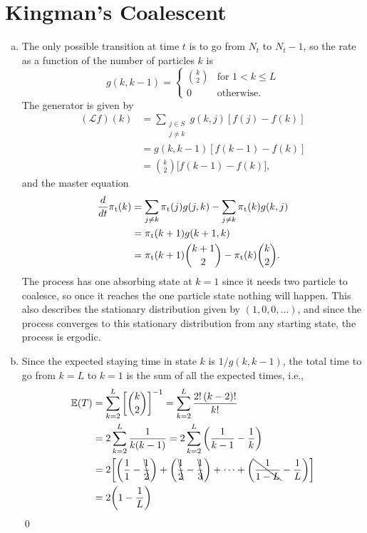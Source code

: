 \documentclass[12pt, twoside, a4paper]{article}
\newcommand{\Gen}{\mathcal{L}}
\begin{document}
\section{Kingman's Coalescent}
\begin{enumerate}[a)]
\item
The only possible transition at time $t$ is to go from $N_t$ to $N_t - 1$, so the rate as a function of the number of particles $k$ is
\[g(k, k-1) = 
\begin{cases}
	{k \choose 2} & \text{for } 1 < k \le L\\
	0 & \text{otherwise.}
\end{cases}
\]
The generator is given by 
\begin{align*}
(\Gen f)(k) &= \sum_{\substack{j \in S \\ j \neq k}} g(k, j)[f(j) - f(k)]\\
&= g(k, k-1)[f(k-1)-f(k)]\\
&= {k \choose 2} \bigg[f(k-1) - f(k) \bigg]\text{,}
\end{align*}
and the master equation
\begin{align*}
\frac{d}{dt}\pi \textsubscript{t} (k) &= \sum_{j \neq k} \pi \textsubscript{t} (j) g(j, k) - \sum_{j \neq k} \pi \textsubscript{t} (k) g(k, j)\\
&= \pi \textsubscript{t} (k+1) g(k+1, k) \\
&= \pi \textsubscript{t} (k + 1) {k+1 \choose 2} - \pi \textsubscript{t} (k) {k \choose 2} \text{.}
\end{align*}
The process has one absorbing state at $k = 1$ since it needs two particle to coalesce, so once it reaches the one particle state nothing will happen. This also describes the stationary distribution given by $(1, 0, 0, \dots)$, and since the process converges to this stationary distribution from any starting state, the process is ergodic. 

\item
Since the expected staying time in state $k$ is $1/g(k, k-1)$, the total time to go from $k = L$ to $k = 1$ is the sum of all the expected times, i.e.,
\begin{align*}
\mathbb{E}(T) 
&= \sum_{k = 2}^{L} \bigg[{k \choose 2} \bigg] ^{-1}
= \sum_{k=2}^{L} \frac{2! \, (k-2)!}{k!}\\
&= 2 \sum_{k = 2}^{L} \frac{1}{k(k-1)}
= 2 \sum_{k = 2}^{L} \bigg( \frac{1}{k-1} - \frac{1}{k} \bigg)\\
&= 2 \bigg[ \bigg( \frac{1}{1} - \bcancel{\frac{1}{2}} \bigg)
		   +\bigg( \bcancel{\frac{1}{2}} -  \bcancel{\frac{1}{3}} \bigg)
		   + \dots
		   +\bigg(  \bcancel{\frac{1}{1-L}} - \frac{1}{L} \bigg) \bigg]\\
&= 2 \bigg( 1 - \frac{1}{L} \bigg) 
\end{align*}
\qed


\end{enumerate}
\end{document}
